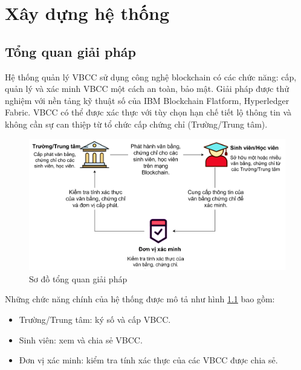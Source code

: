 \chapter{Xây dựng hệ thống}
\section{Tổng quan giải pháp}

Hệ thống quản lý VBCC sử dụng công nghệ blockchain có các chức năng: cấp, quản lý và xác minh VBCC một cách an toàn, bảo mật. Giải pháp được thử nghiệm với nền tảng kỹ thuật số của IBM Blockchain Flatform, Hyperledger Fabric. VBCC có thể được xác thực với tùy chọn hạn chế tiết lộ thông tin và không cần sự can thiệp từ tổ chức cấp chứng chỉ (Trường/Trung tâm).

\begin{figure}[htbp]
\centering
\includegraphics[width=.9\linewidth]{img/vbcc.jpg}
\caption{Sơ đồ tổng quan giải pháp}
\label{fig:vbcc}

\end{figure}
Những chức năng chính của hệ thống được mô tả như hình \ref{fig:vbcc} bao gồm:
\begin{itemize}
\item Trường/Trung tâm: ký số và cấp VBCC.
\item Sinh viên: xem và chia sẻ VBCC.
\item Đơn vị xác minh: kiểm tra tính xác thực của các VBCC được chia sẻ.
\end{itemize}


